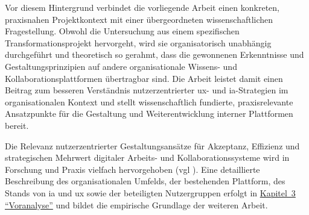 Vor diesem Hintergrund verbindet die vorliegende Arbeit einen konkreten, praxisnahen Projektkontext mit einer übergeordneten wissenschaftlichen Fragestellung. Obwohl die Untersuchung aus einem spezifischen Transformationsprojekt hervorgeht, wird sie organisatorisch unabhängig durchgeführt und theoretisch so gerahmt, dass die gewonnenen Erkenntnisse und Gestaltungsprinzipien auf andere organisationale Wissens- und Kollaborationsplattformen übertragbar sind. Die Arbeit leistet damit einen Beitrag zum besseren Verständnis nutzerzentrierter \Gls{ux}- und \Gls{ia}-Strategien im organisationalen Kontext und stellt wissenschaftlich fundierte, praxisrelevante Ansatzpunkte für die Gestaltung und Weiterentwicklung interner Plattformen bereit.

Die Relevanz nutzerzentrierter Gestaltungsansätze für Akzeptanz, Effizienz und strategischen Mehrwert digitaler Arbeits- und Kollaborationssysteme wird in Forschung und Praxis vielfach hervorgehoben (\acrshort{vgl} \cite{100:WhartonUX2015,300:FraunhoferIESE2018}). Eine detaillierte Beschreibung des organisationalen Umfelds, der bestehenden Plattform, des Stands von \Gls{ia} und \Gls{ux} sowie der beteiligten Nutzergruppen erfolgt in \hyperref[ch:03_pre-analysis]{Kapitel~3 \enquote{Voranalyse}} und bildet die empirische Grundlage der weiteren Arbeit.
